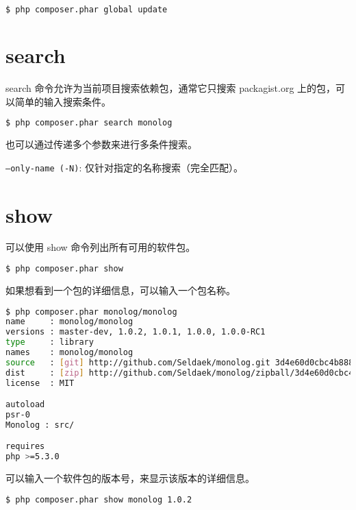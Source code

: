 \begin{lstlisting}[language=bash]
$ php composer.phar global update
\end{lstlisting}

\section{search}

search 命令允许为当前项目搜索依赖包，通常它只搜索 packagist.org 上的包，可以简单的输入搜索条件。

\begin{lstlisting}[language=bash]
$ php composer.phar search monolog
\end{lstlisting}

也可以通过传递多个参数来进行多条件搜索。

\begin{compactitem}
\item \texttt{--only-name (-N)}: 仅针对指定的名称搜索（完全匹配）。
\end{compactitem}



\section{show}

可以使用 show 命令列出所有可用的软件包。

\begin{lstlisting}[language=bash]
$ php composer.phar show
\end{lstlisting}

如果想看到一个包的详细信息，可以输入一个包名称。


\begin{lstlisting}[language=bash]
$ php composer.phar monolog/monolog
name     : monolog/monolog
versions : master-dev, 1.0.2, 1.0.1, 1.0.0, 1.0.0-RC1
type     : library
names    : monolog/monolog
source   : [git] http://github.com/Seldaek/monolog.git 3d4e60d0cbc4b888fe5ad223d77964428b1978da
dist     : [zip] http://github.com/Seldaek/monolog/zipball/3d4e60d0cbc4b888fe5ad223d77964428b1978da 3d4e60d0cbc4b888fe5ad223d77964428b1978da
license  : MIT

autoload
psr-0
Monolog : src/

requires
php >=5.3.0
\end{lstlisting}

可以输入一个软件包的版本号，来显示该版本的详细信息。


\begin{lstlisting}[language=bash]
$ php composer.phar show monolog 1.0.2
\end{lstlisting}


